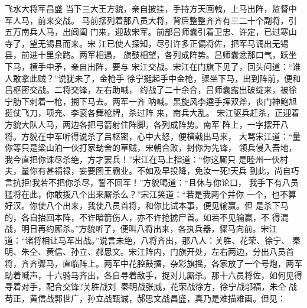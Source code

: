 飞水大将军昌盛
当下三大王方貌，亲自披挂，手持方天画戟，上马出阵，监督中军人马，前来交战。
马前摆列着那八员大将，背后整整齐齐有三二十个副将，引五万南兵人马，出阊阖
门来，迎敌宋军。前部吕师囊引着卫忠、许定，已过寒山寺了，望无锡县而来。宋
江已使人探知，尽引许多正偏将佐，把军马调出无锡县，前进十里余路。两军相遇，
旗鼓相望，各列成阵势。吕师囊忿那口气，跃坐下马，横手中矛，亲自出阵，要与
宋江交战。宋江在门旗下见了，回头问道：“谁人敢拿此贼？”说犹未了，金枪手
徐宁挺起手中金枪，骤坐下马，出到阵前，便和吕枢密交战。二将交锋，左右助喊，
约战了二十余合，吕师囊露出破绽来，被徐宁肋下刺着一枪，搠下马去。两军一齐
呐喊。黑旋风李逵手挥双斧，丧门神鲍旭挺仗飞刀，项充、李衮各舞枪牌，杀过阵
来，南兵大乱。
宋江驱兵赶杀，正迎着方貌大队人马，两边各把弓箭射住阵脚，各列成阵势。南军
阵上，一字摆开八将。方貌在中军听得说杀了吕枢密，心中大怒，便横戟出马来，
大骂宋江道：“量你等只是梁山泊一伙打家劫舍的草贼，宋朝合败，封你为先锋，
领兵侵入吾地，我今直把你诛尽杀绝，方才罢兵！”宋江在马上指道：“你这厮只
是睦州一伙村夫，量你有甚福禄，妄要图王霸业。不如及早投降，免汝一死!天兵
到此，尚自巧言抗拒!我若不把你杀尽，誓不回军！”方貌喝道：“且休与你论口，
我手下有八员猛将在此，你敢拨八个出来厮杀么？”宋江笑道：“若是我两个并你
一个，也不算好汉。你使八个出来，我使八员首将，和你比试本事，便见输赢。但
是杀下马的，各自抬回本阵，不许暗箭伤人，亦不许抢掳尸首。如若不见输赢，不
得混战，明日再约厮杀。”方貌听了，便叫八将出来，各执兵器，骤马向前。宋江
道：“诸将相让马军出战。”说言未绝，八将齐出，那八人：关胜、花荣、徐宁、
秦明、朱仝、黄信、孙立、郝思文。宋江阵内，门旗开处，左右两边，分出八员首
将，齐齐骤马，直临阵上。两军中花腔鼓擂，杂彩旗摇，各家放了一个号炮，两军
助着喊声，十六骑马齐出，各自寻着敌手，捉对儿厮杀。那十六员将佐，如何见得
寻着对手，配合交锋?关胜战刘，秦明战张威，花荣战徐方，徐宁战邬福，朱仝
战苟正，黄信战郭世广，孙立战甄诚，郝思文战昌盛，真乃是难描难画。但见：

